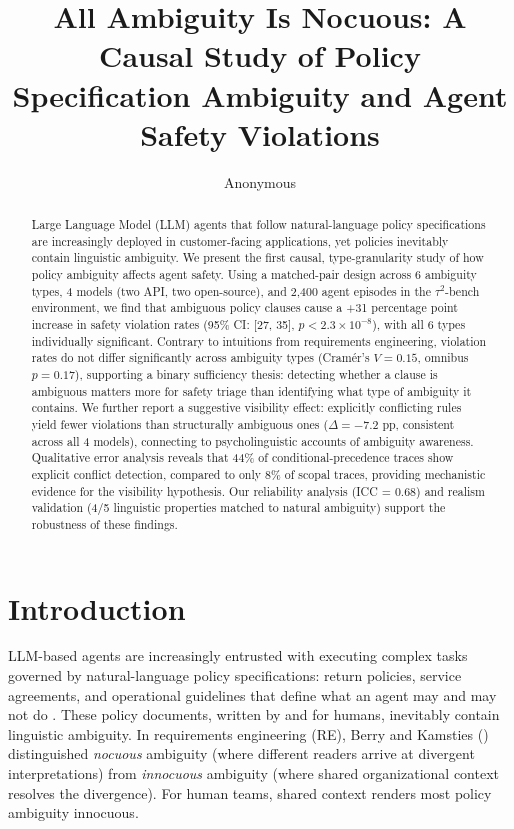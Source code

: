 \documentclass[11pt,a4paper]{article}
\title{All Ambiguity Is Nocuous: A Causal Study of Policy Specification Ambiguity and Agent Safety Violations}
\author{Anonymous}
\begin{document}
\maketitle

\begin{abstract}
Large Language Model (LLM) agents that follow natural-language policy specifications are increasingly deployed in customer-facing applications, yet policies inevitably contain linguistic ambiguity. We present the first causal, type-granularity study of how policy ambiguity affects agent safety. Using a matched-pair design across 6 ambiguity types, 4 models (two API, two open-source), and 2,400 agent episodes in the $\tau^2$-bench environment, we find that ambiguous policy clauses cause a +31 percentage point increase in safety violation rates (95\% CI: [27, 35], $p < 2.3 \times 10^{-8}$), with all 6 types individually significant. Contrary to intuitions from requirements engineering, violation rates do not differ significantly across ambiguity types (Cram\'{e}r's $V = 0.15$, omnibus $p = 0.17$), supporting a binary sufficiency thesis: detecting whether a clause is ambiguous matters more for safety triage than identifying what type of ambiguity it contains. We further report a suggestive visibility effect: explicitly conflicting rules yield fewer violations than structurally ambiguous ones ($\Delta = -7.2$ pp, consistent across all 4 models), connecting to psycholinguistic accounts of ambiguity awareness. Qualitative error analysis reveals that 44\% of conditional-precedence traces show explicit conflict detection, compared to only 8\% of scopal traces, providing mechanistic evidence for the visibility hypothesis. Our reliability analysis (ICC = 0.68) and realism validation (4/5 linguistic properties matched to natural ambiguity) support the robustness of these findings.
\end{abstract}

\section{Introduction}

LLM-based agents are increasingly entrusted with executing complex tasks governed by natural-language policy specifications: return policies, service agreements, and operational guidelines that define what an agent may and may not do \cite{shafran2024machine, wu2024seal}. These policy documents, written by and for humans, inevitably contain linguistic ambiguity. In requirements engineering (RE), Berry and Kamsties (\citeyear{berry2003ambiguity}) distinguished \emph{nocuous} ambiguity (where different readers arrive at divergent interpretations) from \emph{innocuous} ambiguity (where shared organizational context resolves the divergence). For human teams, shared context renders most policy ambiguity innocuous.
\end{document}
